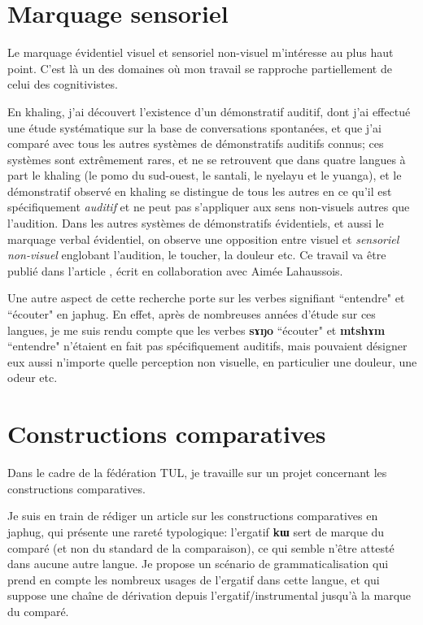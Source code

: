 \documentclass[oldfontcommands,oneside,a4paper,11pt]{memoir}
\newcommand{\ipa}[1]{{\phon\textbf{#1}}}
\begin{document}
\section{Marquage sensoriel}
Le marquage évidentiel visuel et sensoriel non-visuel m'intéresse au plus haut point. C'est là un des domaines où mon travail se rapproche partiellement de celui des cognitivistes.

En khaling, j'ai découvert l'existence d'un démonstratif auditif, dont j'ai effectué une étude systématique sur la base de conversations spontanées, et que j'ai comparé avec tous les autres systèmes de démonstratifs auditifs connus; ces systèmes sont extrêmement rares, et ne se retrouvent que dans quatre langues à part le khaling (le pomo du sud-ouest, le santali, le nyelayu et le yuanga), et le démonstratif observé en khaling se distingue de tous les autres en ce qu'il est spécifiquement \textit{auditif} et ne peut pas s'appliquer aux sens non-visuels autres que l'audition. Dans les autres systèmes de démonstratifs évidentiels, et aussi le marquage verbal évidentiel, on observe une opposition entre visuel et \textit{sensoriel non-visuel} englobant l'audition, le toucher, la douleur etc.
Ce travail va être publié dans l'article \citet{jacques14auditory}, écrit en collaboration avec Aimée Lahaussois.

Une autre aspect de cette recherche porte sur les verbes signifiant ``entendre" et ``écouter" en japhug. En effet, après de nombreuses années d'étude sur ces langues, je me suis rendu compte que les verbes \ipa{sɤŋo} ``écouter" et \ipa{mtshɤm} ``entendre" n'étaient en fait pas spécifiquement auditifs, mais pouvaient désigner eux aussi n'importe quelle perception non visuelle, en particulier une douleur, une odeur etc.


\section{Constructions comparatives}
Dans le cadre de la fédération TUL, je travaille sur un projet concernant les constructions comparatives. 

Je suis en train de rédiger un article sur les constructions comparatives en japhug, qui présente une rareté typologique: l'ergatif \ipa{kɯ} sert de marque du comparé (et non du standard de la comparaison), ce qui semble n'être attesté dans aucune autre langue. Je propose un scénario de grammaticalisation qui prend en compte les nombreux usages de l'ergatif dans cette langue, et qui suppose une chaîne de dérivation depuis l'ergatif/instrumental jusqu'à la marque du comparé.
\end{document}
